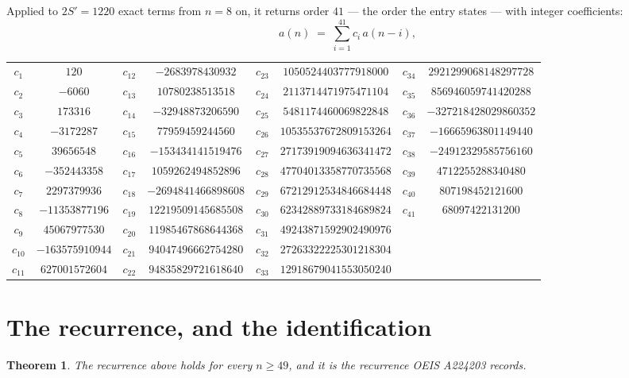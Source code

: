\documentclass[11pt,a4paper]{article}
\theoremstyle{plain}
\newtheorem{theorem}{Theorem}
\theoremstyle{definition}
\begin{document}
Applied to $2S'=1220$ exact terms from $n=8$ on, it returns order $41$ --- the
order the entry states --- with integer coefficients:
\[
a(n)\;=\;\sum_{i=1}^{41}c_i\,a(n-i),
\]
\begin{center}\small
\begin{tabular}{cccccccc}
$c_{1}$ & $120$ & $c_{12}$ & $-2683978430932$ & $c_{23}$ & $1050524403777918000$ & $c_{34}$ & $2921299068148297728$ \\
$c_{2}$ & $-6060$ & $c_{13}$ & $10780238513518$ & $c_{24}$ & $2113714471975471104$ & $c_{35}$ & $856946059741420288$ \\
$c_{3}$ & $173316$ & $c_{14}$ & $-32948873206590$ & $c_{25}$ & $5481174460069822848$ & $c_{36}$ & $-327218428029860352$ \\
$c_{4}$ & $-3172287$ & $c_{15}$ & $77959459244560$ & $c_{26}$ & $10535537672809153264$ & $c_{37}$ & $-16665963801149440$ \\
$c_{5}$ & $39656548$ & $c_{16}$ & $-153434141519476$ & $c_{27}$ & $27173919094636341472$ & $c_{38}$ & $-24912329585756160$ \\
$c_{6}$ & $-352443358$ & $c_{17}$ & $1059262494852896$ & $c_{28}$ & $47704013358770735568$ & $c_{39}$ & $4712255288340480$ \\
$c_{7}$ & $2297379936$ & $c_{18}$ & $-2694841466898608$ & $c_{29}$ & $67212912534846684448$ & $c_{40}$ & $807198452121600$ \\
$c_{8}$ & $-11353877196$ & $c_{19}$ & $12219509145685508$ & $c_{30}$ & $62342889733184689824$ & $c_{41}$ & $68097422131200$ \\
$c_{9}$ & $45067977530$ & $c_{20}$ & $11985467868644368$ & $c_{31}$ & $49243871592902490976$ &  &  \\
$c_{10}$ & $-163575910944$ & $c_{21}$ & $94047496662754280$ & $c_{32}$ & $27263322225301218304$ &  &  \\
$c_{11}$ & $627001572604$ & $c_{22}$ & $94835829721618640$ & $c_{33}$ & $12918679041553050240$ &  &  \\
\end{tabular}
\end{center}

\section{The recurrence, and the identification}

\begin{theorem}
The recurrence above holds for every $n\ge49$, and it is the recurrence OEIS A224203 records.
\end{theorem}
\end{document}

